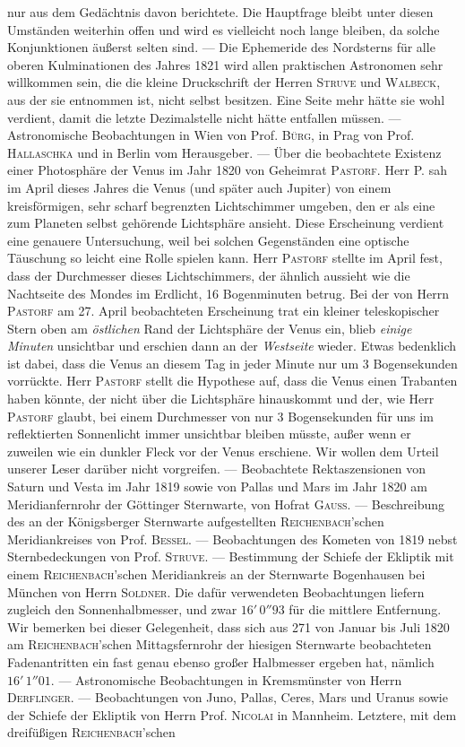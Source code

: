 nur aus dem Gedächtnis davon berichtete. Die Hauptfrage bleibt unter diesen Umständen weiterhin offen und wird es vielleicht noch lange bleiben, da solche Konjunktionen äußerst selten sind. --- Die Ephemeride des Nordsterns für alle oberen Kulminationen des Jahres 1821 wird allen praktischen Astronomen sehr willkommen sein, die die kleine Druckschrift der Herren \textsc{Struve} und \textsc{Walbeck}, aus der sie entnommen ist, nicht selbst besitzen. Eine Seite mehr hätte sie wohl verdient, damit die letzte Dezimalstelle nicht hätte entfallen müssen. --- Astronomische Beobachtungen in Wien von Prof. \textsc{Bürg}, in Prag von Prof. \textsc{Hallaschka} und in Berlin vom Herausgeber. --- Über die beobachtete Existenz einer Photosphäre der Venus im Jahr 1820 von Geheimrat \textsc{Pastorf}. Herr P. sah im April dieses Jahres die Venus (und später auch Jupiter) von einem kreisförmigen, sehr scharf begrenzten Lichtschimmer umgeben, den er als eine zum Planeten selbst gehörende Lichtsphäre ansieht. Diese Erscheinung verdient eine genauere Untersuchung, weil bei solchen Gegenständen eine optische Täuschung so leicht eine Rolle spielen kann. Herr \textsc{Pastorf} stellte im April fest, dass der Durchmesser dieses Lichtschimmers, der ähnlich aussieht wie die Nachtseite des Mondes im Erdlicht, 16 Bogenminuten betrug. Bei der von Herrn \textsc{Pastorf} am 27. April beobachteten Erscheinung trat ein kleiner teleskopischer Stern oben am \emph{östlichen} Rand der Lichtsphäre der Venus ein, blieb \emph{einige Minuten} unsichtbar und erschien dann an der \emph{Westseite} wieder. Etwas bedenklich ist dabei, dass die Venus an diesem Tag in jeder Minute nur um 3 Bogensekunden vorrückte. Herr \textsc{Pastorf} stellt die Hypothese auf, dass die Venus einen Trabanten haben könnte, der nicht über die Lichtsphäre hinauskommt und der, wie Herr \textsc{Pastorf} glaubt, bei einem Durchmesser von nur 3 Bogensekunden für uns im reflektierten Sonnenlicht immer unsichtbar bleiben müsste, außer wenn er zuweilen wie ein dunkler Fleck vor der Venus erschiene. Wir wollen dem Urteil unserer Leser darüber nicht vorgreifen. --- Beobachtete Rektaszensionen von Saturn und Vesta im Jahr 1819 sowie von Pallas und Mars im Jahr 1820 am Meridianfernrohr der Göttinger Sternwarte, von Hofrat \textsc{Gauss}. --- Beschreibung des an der Königsberger Sternwarte aufgestellten \textsc{Reichenbach}'schen Meridiankreises von Prof. \textsc{Bessel}. --- Beobachtungen des Kometen von 1819 nebst Sternbedeckungen von Prof. \textsc{Struve}. --- Bestimmung der Schiefe der Ekliptik mit einem \textsc{Reichenbach}'schen Meridiankreis an der Sternwarte Bogenhausen bei München von Herrn \textsc{Soldner}. Die dafür verwendeten Beobachtungen liefern zugleich den Sonnenhalbmesser, und zwar $16'\,0''93$ für die mittlere Entfernung. Wir bemerken bei dieser Gelegenheit, dass sich aus 271 von Januar bis Juli 1820 am \textsc{Reichenbach}'schen Mittagsfernrohr der hiesigen Sternwarte beobachteten Fadenantritten ein fast genau ebenso großer Halbmesser ergeben hat, nämlich $16'\,1''01$. --- Astronomische Beobachtungen in Kremsmünster von Herrn \textsc{Derflinger}. --- Beobachtungen von Juno, Pallas, Ceres, Mars und Uranus sowie der Schiefe der Ekliptik von Herrn Prof. \textsc{Nicolai} in Mannheim. Letztere, mit dem dreifüßigen \textsc{Reichenbach}'schen 